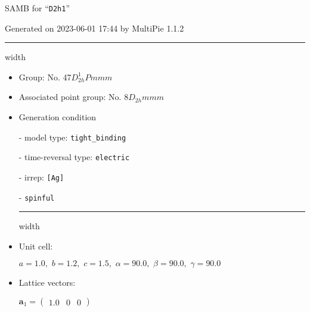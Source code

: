 \documentclass[fleqn,10pt,landscape]{article}
\begin{document}
\setcounter{MaxMatrixCols}{16}

\setlength{\baselineskip}{16pt}
\footnotesize
\begin{center}
\LARGE
SAMB for ``\texttt{D2h1}''
\end{center}
\begin{flushright}
Generated on 2023-06-01 17:44 by MultiPie 1.1.2
\end{flushright}
\vspace{1cm}


 \hfil \hrule height 1mm width \textwidth \hfil

\begin{itemize}
\item Group: No. 47\quad$D_{2h}^{1}$\quad$Pmmm$\quad[ orthorhombic ]

\item Associated point group: No. 8\quad$D_{2h}$\quad$mmm$\quad[ orthorhombic ]

\vspace{5mm}

\item Generation condition

\quad - model type: \texttt{tight_binding}

\quad - time-reversal type: \texttt{electric}

\quad - irrep: \texttt{[Ag]}

\quad - \texttt{spinful}


 \hfil \hrule height 1mm width \textwidth \hfil

\item Unit cell:

\quad $a=1.0,\,\, b=1.2,\,\, c=1.5,\,\, \alpha=90.0,\,\, \beta=90.0,\,\, \gamma=90.0$

\item Lattice vectors:

\quad $\bm{a}_1=\begin{pmatrix} 1.0 & 0 & 0 \end{pmatrix}$


\end{itemize}
\end{document}

